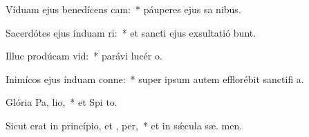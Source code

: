 \item Víduam ejus benedícens cam:~* páuperes ejus sa nibus.
\item Sacerdótes ejus índuam ri:~* et sancti ejus exsultatió bunt.
\item Illuc prodúcam  vid:~* parávi lucér  o.
\item Inimícos ejus índuam conne:~* super ipsum autem efflorébit sanctifi a.
\item Glória Pa,  lio,~* et Spi to.
\item Sicut erat in princípio, et ,  per,~* et in sǽcula sæ. men.

